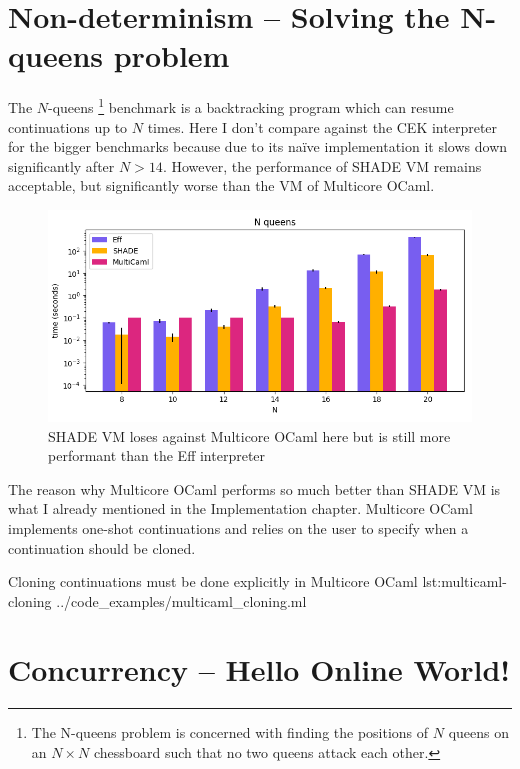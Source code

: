 \documentclass[class=article, crop=false]{standalone}
\begin{document}
\section{Non-determinism -- Solving the N-queens problem}

The $N$-queens
\footnote{The N-queens problem is concerned with finding the positions of $N$ queens on an $N \times N$ chessboard
such that no two queens attack each other.}
benchmark is a backtracking program which can resume continuations up to $N$ times. Here I don't compare against the CEK interpreter
for the bigger benchmarks because due to its naïve implementation it slows down significantly after $N > 14$. However, the performance of
SHADE VM remains acceptable, but significantly worse than the VM of Multicore OCaml.

\begin{figure}
    \centering
    \includegraphics[width=35em]{eval_plots/comp_queens.png}
    \caption{SHADE VM loses against Multicore OCaml here but is still more performant than the Eff interpreter}
    \label{fig:n-queens}
\end{figure}

The reason why Multicore OCaml performs so much better than SHADE VM is what I already mentioned in the Implementation chapter. Multicore OCaml
implements one-shot continuations and relies on the user to specify when a continuation should be cloned.

{Cloning continuations must be done explicitly in Multicore OCaml}
{lst:multicaml-cloning}
{../code_examples/multicaml_cloning.ml}

\section{Concurrency -- Hello Online World!}
\end{document}
